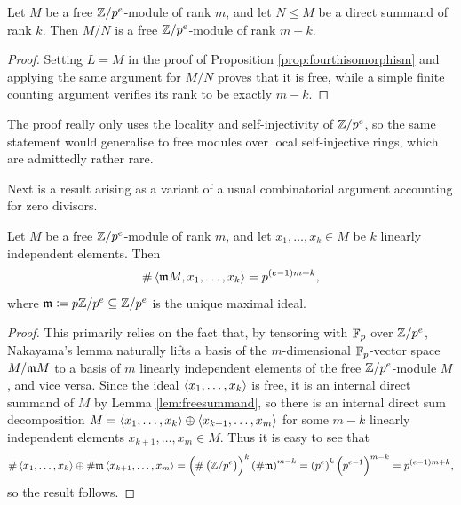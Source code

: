 \begin{corollary}
\label{cor:freequotient}
Let $ M $ be a free $ \mathbb{Z} / p^e $-module of rank $ m $, and let $ N \le M $ be a direct summand of rank $ k $. Then $ M / N $ is a free $ \mathbb{Z} / p^e $-module of rank $ m - k $.
\end{corollary}

\begin{proof}
Setting $ L = M $ in the proof of Proposition \ref{prop:fourthisomorphism} and applying the same argument for $ M / N $ proves that it is free, while a simple finite counting argument verifies its rank to be exactly $ m - k $.
\end{proof}

\begin{remark}
The proof really only uses the locality and self-injectivity of $ \mathbb{Z} / p^e $, so the same statement would generalise to free modules over local self-injective rings, which are admittedly rather rare.
\end{remark}

Next is a result arising as a variant of a usual combinatorial argument accounting for zero divisors.

\begin{lemma}
\label{lem:linearlyindependent}
Let $ M $ be a free $ \mathbb{Z} / p^e $-module of rank $ m $, and let $ x_1, \dots, x_k \in M $ be $ k $ linearly independent elements. Then
$$ \#\abr{\mmm M, x_1, \dots, x_k} = p^{\br{e - 1}m + k}, $$
where $ \mathfrak{m} \coloneqq p\mathbb{Z} / p^e \subseteq \mathbb{Z} / p^e $ is the unique maximal ideal.
\end{lemma}

\begin{proof}
This primarily relies on the fact that, by tensoring with $ \mathbb{F}_p $ over $ \mathbb{Z} / p^e $, Nakayama's lemma naturally lifts a basis of the $ m $-dimensional $ \mathbb{F}_p $-vector space $ M / \mathfrak{m} M $ to a basis of $ m $ linearly independent elements of the free $ \mathbb{Z} / p^e $-module $ M $, and vice versa. Since the ideal $ \left\langle x_1, \dots, x_k \right\rangle $ is free, it is an internal direct summand of $ M $ by Lemma \ref{lem:freesummand}, so there is an internal direct sum decomposition $ M = \left\langle x_1, \dots, x_k \right\rangle \oplus \left\langle x_{k + 1}, \dots, x_m \right\rangle $ for some $ m - k $ linearly independent elements $ x_{k + 1}, \dots, x_m \in M $. Thus it is easy to see that
$$ \#\abr{x_1, \dots, x_k} \oplus \#\mmm\abr{x_{k + 1}, \dots, x_m} = \br{\#\br{\ZZ / p^e}}^k\br{\#\mmm}^{m - k} = \br{p^e}^k\br{p^{e - 1}}^{m - k} = p^{\br{e - 1}m + k}, $$
so the result follows.
\end{proof}

